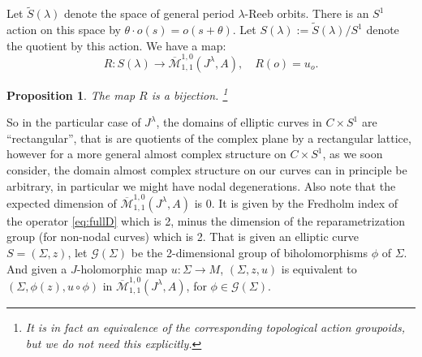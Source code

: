 \documentclass{amsart}
\numberwithin{equation}{section}
\newtheorem{proposition}[equation]{Proposition}
\newtheorem{lemma}[equation]{Lemma}
\theoremstyle{definition}
\theoremstyle{remark}
\begin{document}
Let $\widetilde{S} (\lambda)$ denote the space of general period $\lambda$-Reeb orbits. There is an $S ^{1} $ action on this space by $\theta \cdot o (s)= o (s+\theta) $. Let $ {S} (\lambda):= \widetilde{S} (\lambda)/S ^{1}$ denote the quotient by this action.
We have a map:
\begin{equation*}
   R: S (\lambda) \to \overline{\mathcal{M}} ^{1,0} _{1,1}  (J ^{\lambda}, A), \quad R (o) = u _{o}.
\end{equation*}
\begin{proposition} \label{prop:abstractmomentmap}
The map $R$ is a bijection. \footnote{It is in fact an equivalence of the corresponding topological action groupoids, but we do not need this explicitly.}
\end{proposition}
So in the particular case of $J ^{\lambda} $, the domains of elliptic curves in $C \times S ^{1} $ are ``rectangular'', that is are quotients of the complex plane by a rectangular lattice, however for a more general almost complex structure on $C \times S ^{1} $, as we soon consider, the domain almost complex structure on our curves can in principle be arbitrary, in particular we might have nodal degenerations.
Also note that the expected dimension of $\overline{\mathcal{M}} _{1,1} ^{1,0}   (
{J} ^{\lambda},
A )$ is 0. It is given by the
Fredholm index of the operator \eqref{eq:fullD} which is 2, minus the dimension of the reparametrization group (for non-nodal curves) which is 2. That is given an elliptic curve $S = (\Sigma,  z) $,  let $\mathcal{G} (\Sigma)$ be the 2-dimensional group of biholomorphisms $\phi$ of $\Sigma$. And given a $J$-holomorphic map $u: \Sigma \to M$, $(\Sigma,z,u)$ is equivalent to 
$(\Sigma, \phi(z), u \circ \phi)$ in $\overline{\mathcal{M}} _{1,1} ^{1,0}  (
{J} ^{\lambda}, A)$, for $\phi \in \mathcal{G} (\Sigma)$. 
\end{document}
